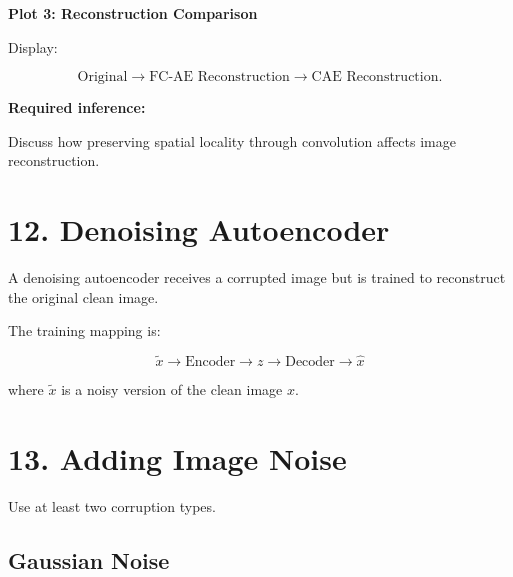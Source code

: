 \documentclass[10pt]{article}
\begin{document}
\textbf{Plot 3: Reconstruction Comparison}

Display:

\[
\text{Original}
\rightarrow
\text{FC-AE Reconstruction}
\rightarrow
\text{CAE Reconstruction}.
\]

\textbf{Required inference:}

Discuss how preserving spatial locality through convolution affects image
reconstruction.

\section*{12. Denoising Autoencoder}

A denoising autoencoder receives a corrupted image but is trained to
reconstruct the original clean image.

The training mapping is:

\[
\boxed{\tilde{x}\rightarrow\text{Encoder}\rightarrow z
\rightarrow\text{Decoder}\rightarrow\hat{x}}
\]

where $\tilde{x}$ is a noisy version of the clean image $x$.

\begin{center}
\end{center}

\section*{13. Adding Image Noise}

Use at least two corruption types.

\subsection*{Gaussian Noise}
\end{document}
